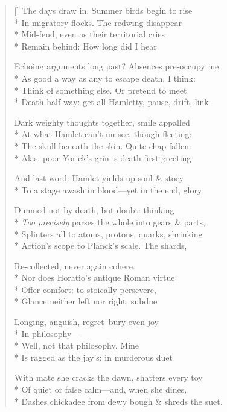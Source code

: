 \label{ch:alas_poor_hamlet}
\begin{verse}[\versewidth]
The days draw in. Summer birds begin to rise\\*
In migratory flocks. The redwing disappear\\*
Mid-feud, even as their territorial cries\\*
Remain behind: How long did I hear

Echoing arguments long past? Absences pre-occupy me.\\*
As good a way as any to escape death, I think:\\*
Think of something else. Or pretend to meet\\*
Death half-way: get all Hamletty, pause, drift, link

Dark weighty thoughts together, smile appalled\\*
At what Hamlet can't un-see, though fleeting:\\*
The skull beneath the skin. Quite chap-fallen:\\*
Alas, poor Yorick's grin is death first greeting

And last word: Hamlet yields up soul \& story\\*
To a stage awash in blood---yet in the end, glory

Dimmed not by death, but doubt: thinking\\*
\textit{Too precisely} parses the whole into gears \& parts,\\*
Splinters all to atoms, protons, quarks, shrinking\\*
Action's scope to Planck's scale. The shards,

Re-collected, never again cohere.\\*
Nor does Horatio's antique Roman virtue\\*
Offer comfort: to stoically persevere,\\*
Glance neither left nor right, subdue

Longing, anguish, regret--bury even joy\\*
In philosophy---\\*
 Well, not that philosophy. \quad Mine\\*
Is ragged as the jay's: in murderous duet

With mate she cracks the dawn, shatters every toy\\*
Of quiet or false calm---and, when she dines,\\*
Dashes chickadee from dewy bough \& shreds the suet.
\end{verse}
